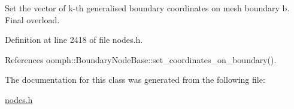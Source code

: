 Set the vector of k-\/th generalised boundary coordinates on mesh boundary b. Final overload. 



Definition at line 2418 of file nodes.\+h.



References oomph\+::\+Boundary\+Node\+Base\+::set\+\_\+coordinates\+\_\+on\+\_\+boundary().



The documentation for this class was generated from the following file\+:\begin{DoxyCompactItemize}
\item 
\hyperlink{nodes_8h}{nodes.\+h}\end{DoxyCompactItemize}
